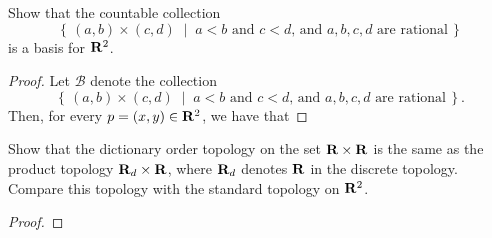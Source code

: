 \begin{problem}[Munkres, \S16, 6.]
Show that the countable collection
\[
\left\{\,(a,b)\times(c,d)\;\middle|\;
\text{$a<b$ and $c<d$, and $a,b,c,d$ are rational}\,\right\}
\]
is a basis for $\mathbf{R}^2$.
\end{problem}
\begin{proof}
Let $\mathcal{B}$ denote the collection
\[
\left\{\,(a,b)\times(c,d)\;\middle|\;
\text{$a<b$ and $c<d$, and $a,b,c,d$ are rational}\,\right\}.
\]
Then, for every $p=(x,y)\in\mathbf{R}^2$,
we have that
\end{proof}
\newpage

\begin{problem}[Munkres, \S16, 9.]
Show that the dictionary order topology on the set $\mathbf{R}\times\mathbf{R}$
is the same as the product topology $\mathbf{R}_d\times\mathbf{R}$, where
$\mathbf{R}_d$ denotes $\mathbf{R}$ in the discrete topology. Compare this
topology with the standard topology on $\mathbf{R}^2$.
\end{problem}
\begin{proof}
\end{proof}

